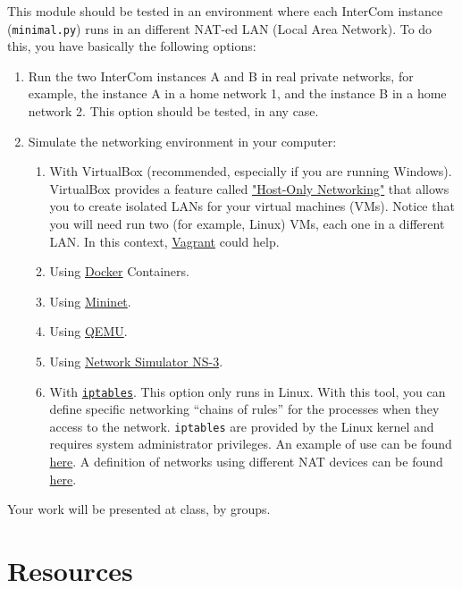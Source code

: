 This module should be tested in an environment where each InterCom
instance (\texttt{minimal.py}) runs in an different NAT-ed LAN (Local
Area Network). To do this, you have basically the following options:
\begin{enumerate}
\item Run the two InterCom instances A and B in real private networks,
  for example, the instance A in a home network 1, and the instance B
  in a home network 2. This option should be tested, in any case.
\item Simulate the networking environment in your computer:
  \begin{enumerate}
  \item With VirtualBox (recommended, especially if you are running
    Windows). VirtualBox provides a feature called
    \href{https://www.virtualbox.org/manual/ch06.html#network_hostonly}{"Host-Only
      Networking"} that allows you to create isolated LANs for your
    virtual machines (VMs). Notice that you will need run two (for
    example, Linux) VMs, each one in a different LAN. In this context,
    \href{https://www.vagrantup.com/}{Vagrant} could help.
  \item Using \href{https://www.docker.com/}{Docker} Containers.
  \item Using \href{http://mininet.org/}{Mininet}.
  \item Using \href{https://www.qemu.org/}{QEMU}.
  \item Using \href{https://www.nsnam.org/}{Network Simulator NS-3}.
  \item With
    \href{https://en.wikipedia.org/wiki/Iptables}{\texttt{iptables}}. This
    option only runs in Linux. With this tool, you can define specific
    networking ``chains of rules'' for the processes when they access
    to the network. \texttt{iptables} are provided by the Linux kernel
    and requires system administrator privileges. An example of use
    can be found
    \href{https://github.com/P2PSP/console/blob/master/src/setup_NAT_network.sh}{here}. A
    definition of networks using different NAT devices can be found
    \href{https://github.com/P2PSP/core/tree/master/doc/NTS/iptables}{here}.
  \end{enumerate}
\end{enumerate}

Your work will be presented at class, by groups.

\section{Resources}


